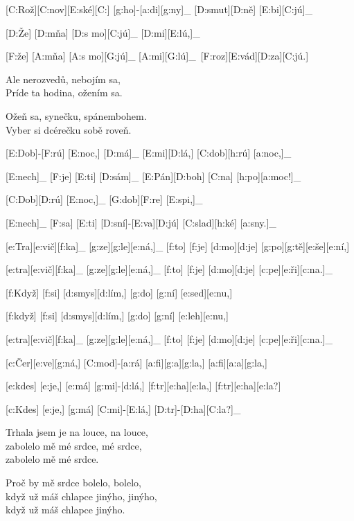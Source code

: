
[C:Rož][C:nov][E:ské][C:] [g:ho]-[a:di][g:ny]_ [D:smut][D:ně] [E:bi][C:jú]_\

[D:Že] [D:mňa] [D:s mo][C:jú]_ [D:mi][E:lú,]_\

[F:že] [A:mňa] [A:s mo][G:jú]_ [A:mi][G:lú]_\
[F:roz][E:vád][D:za][C:jú.]\

Ale nerozvedů, nebojím sa,\\
Príde ta hodina, ožením sa.

Ožeň sa, synečku, spánembohem.\\
Vyber si dcérečku sobě roveň.



[E:Dob]-[F:rú] [E:noc,] [D:má]_ [E:mi][D:lá,] [C:dob][h:rú] [a:noc,]_\

[E:nech]_ [F:je] [E:ti] [D:sám]_ [E:Pán][D:boh] [C:na] [h:po][a:moc!]_\

[C:Dob][D:rú] [E:noc,]_ [G:dob][F:re] [E:spi,]_\

[E:nech]_ [F:sa] [E:ti] [D:sní]-[E:va][D:jú] [C:slad][h:ké] [a:sny.]_\



[e:Tra][e:vič][f:ka]_ [g:ze][g:le][e:ná,]_ [f:to] [f:je] [d:mo][d:je] [g:po][g:tě][e:še][e:ní,]\

[e:tra][e:vič][f:ka]_ [g:ze][g:le][e:ná,]_ [f:to] [f:je] [d:mo][d:je] [c:pe][e:ři][c:na.]_\

[f:Když] [f:si] [d:smys][d:lím,] [g:do] [g:ní] [e:sed][e:nu,]\

[f:když] [f:si] [d:smys][d:lím,] [g:do] [g:ní] [e:leh][e:nu,]\

[e:tra][e:vič][f:ka]_ [g:ze][g:le][e:ná,]_ [f:to] [f:je] [d:mo][d:je] [c:pe][e:ři][c:na.]_\



[c:Čer][e:ve][g:ná,] [C:mod]-[a:rá] [a:fi][g:a][g:la,] [a:fi][a:a][g:la,]\

[e:kdes] [e:je,] [e:má] [g:mi]-[d:lá,] [f:tr][e:ha][e:la,] [f:tr][e:ha][e:la?]\

[c:Kdes] [e:je,] [g:má] [C:mi]-[E:lá,] [D:tr]-[D:ha][C:la?]_\

Trhala jsem je na louce, na louce,\\
zabolelo mě mé srdce, mé srdce,\\
zabolelo mě mé srdce.

Proč by mě srdce bolelo, bolelo,\\
když už máš chlapce jinýho, jinýho,\\
když už máš chlapce jinýho.


